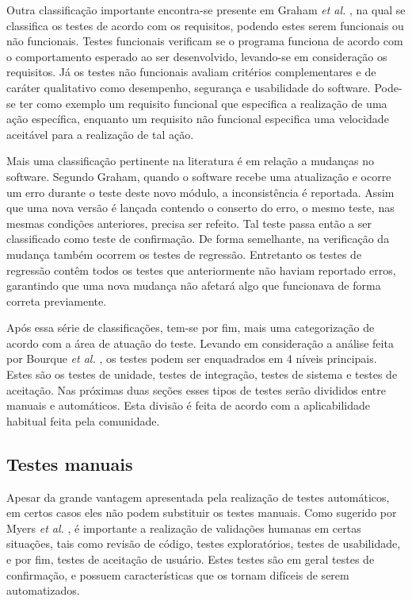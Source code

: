 Outra classificação importante encontra-se presente em Graham \emph{et al.} \cite{graham}, na qual se classifica os testes de acordo com os requisitos, podendo estes serem funcionais ou não funcionais. Testes funcionais verificam se o programa funciona de acordo com o comportamento esperado ao ser desenvolvido, levando-se em consideração os requisitos. Já os testes não funcionais avaliam critérios complementares e de caráter qualitativo como desempenho, segurança e usabilidade do software. Pode-se ter como exemplo um requisito funcional que especifica a realização de uma ação específica, enquanto um requisito não funcional especifica uma velocidade aceitável para a realização de tal ação.

Mais uma classificação pertinente na literatura é em relação a mudanças no software. Segundo Graham, quando o software recebe uma atualização e ocorre um erro durante o teste deste novo módulo, a inconsistência é reportada. Assim que uma nova versão é lançada contendo o conserto do erro, o mesmo teste, nas mesmas condições anteriores, precisa ser refeito. Tal teste passa então a ser classificado como teste de confirmação. De forma semelhante, na verificação da mudança também ocorrem os testes de regressão. Entretanto os testes de regressão contêm todos os testes que anteriormente não haviam reportado erros, garantindo que uma nova mudança não afetará algo que funcionava de forma correta previamente.

Após essa série de classificações, tem-se por fim, mais uma categorização de acordo com a área de atuação do teste. Levando em consideração a análise feita por Bourque \emph{et al.} \cite{bourque}, os testes podem ser enquadrados em 4 níveis principais. Estes são os testes de unidade, testes de integração, testes de sistema e testes de aceitação. Nas próximas duas seções esses tipos de testes serão divididos entre manuais e automáticos. Esta divisão é feita de acordo com a aplicabilidade habitual feita pela comunidade.

\hypertarget{testes-manuais}{%
\subsection{Testes manuais}\label{testes-manuais}}

Apesar da grande vantagem apresentada pela realização de testes automáticos, em certos casos eles não podem substituir os testes manuais. Como sugerido por Myers \emph{et al.} \cite{myers}, é importante a realização de validações humanas em certas situações, tais como revisão de código, testes exploratórios, testes de usabilidade, e por fim, testes de aceitação de usuário. Estes testes são em geral testes de confirmação, e possuem características que os tornam difíceis de serem automatizados.

